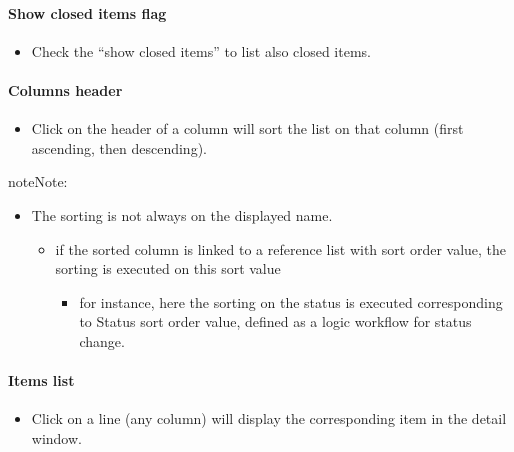\documentclass[letterpaper,10pt,english]{sphinxmanual}
\begin{document}
\paragraph{Show closed items flag}
\begin{itemize}
\item {} 
Check the “show closed items” to list also closed items.

\end{itemize}
\paragraph{Columns header}
\begin{itemize}
\item {} 
Click on the header of a column will sort the list on that column (first ascending, then descending).

\end{itemize}

\begin{notice}{note}{Note:}\begin{itemize}
\item {} 
The sorting is not always on the displayed name.
\begin{itemize}
\item {} 
if the sorted column is linked to a reference list with sort order value, the sorting is executed on this sort value
\begin{itemize}
\item {} 
for instance, here the sorting on the status is executed corresponding to Status sort order value, defined as a logic workflow for status change.

\end{itemize}

\end{itemize}

\end{itemize}
\end{notice}
\paragraph{Items list}
\begin{itemize}
\item {} 
Click on a line (any column) will display the corresponding item in the detail window.

\end{itemize}
\newpage
\end{document}
